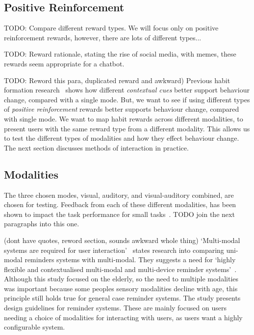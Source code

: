 \documentclass{scaffold/sigchi}
\begin{document}
\subsection{Positive Reinforcement}
TODO: Compare different reward types. We will focus only on positive reinforcement rewards, however, there are lots of different types...

TODO: Reward rationale, stating the rise of social media, with memes, these rewards seem appropriate for a chatbot.

TODO: Reword this para, duplicated reward and awkward) Previous habit formation research~\cite{article_understanding_use_contextual_cues_design_impl} shows how different \textit{contextual cues} better support behaviour change, compared with a single mode. But, we want to see if using different types of \textit{positive reinforcement} rewards better supports behaviour change, compared with single mode. We want to map habit rewards across different modalities, to present users with the same reward type from a different modality.
This allows us to test the different types of modalities and how they effect behaviour change.
The next section discusses methods of interaction in practice.

\subsection{Modalities}
The three chosen modes, visual, auditory, and visual-auditory combined, are chosen for testing. Feedback from each of these different modalities, has been shown to impact the task performance for small tasks~\cite{chi_oussama_tap_the_shapetones}. TODO join the next paragraphs into this one.


(dont have quotes, reword section, sounds awkward whole thing) `Multi-modal systems are required for user interaction'~\cite{article_user_centred_multimodal_reminders} states research into comparing uni-modal reminders systems with multi-modal.
They suggests a need for `highly flexible and contextualised multi-modal and multi-device reminder systems'~\cite{article_user_centred_multimodal_reminders}.
Although this study focused on the elderly, so the need to multiple modalities was important because some peoples sensory modalities decline with age,
this principle still holds true for general case reminder systems. The study presents design guidelines for reminder systems.
These are mainly focused on users needing a choice of modalities for interacting with users, as users want a highly configurable system.
\end{document}
